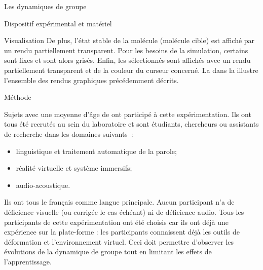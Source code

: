 \documentclass[myfrancais]{mythesis}
\begin{document}
\begin{mychapter}{Les dynamiques de groupe}
\begin{mysection}{Dispositif expérimental et matériel}
\begin{mysubsection}{Visualisation}
				De plus, l'état stable de la molécule (molécule cible) est affiché par un rendu \myNewRibbon partiellement transparent.
				Pour les besoins de la simulation, certains  sont fixes et sont alors grisés.
				Enfin, les  sélectionnés sont affichés avec un rendu \myCPK partiellement transparent et de la couleur du curseur concerné.
				La  dans la  illustre l'ensemble des rendus graphiques précédemment décrits.
			\end{mysubsection}
		\end{mysection}
		\begin{mysection}{Méthode}
			\begin{mysubsection}{Sujets}
				 avec une moyenne d'âge de  ont participé à cette expérimentation.
				Ils ont tous été recrutés au sein du laboratoire  et sont étudiants, chercheurs ou assistants de recherche dans les domaines suivants~:
				\begin{itemize}
					\item linguistique et traitement automatique de la parole;
					\item réalité virtuelle et système immersifs;
					\item audio-acoustique.
				\end{itemize}
				Ils ont tous le français comme langue principale.
				Aucun participant n'a de déficience visuelle (ou corrigée le cas échéant) ni de déficience audio.
				Tous les participants de cette expérimentation ont été choisis car ils ont déjà une expérience sur la plate-forme : les participants connaissent déjà les outils de déformation et l'environnement virtuel.
				Ceci doit permettre d'observer les évolutions de la dynamique de groupe tout en limitant les effets de l'apprentissage.


\end{mysubsection}
\end{mysection}
\end{mychapter}
\end{document}
